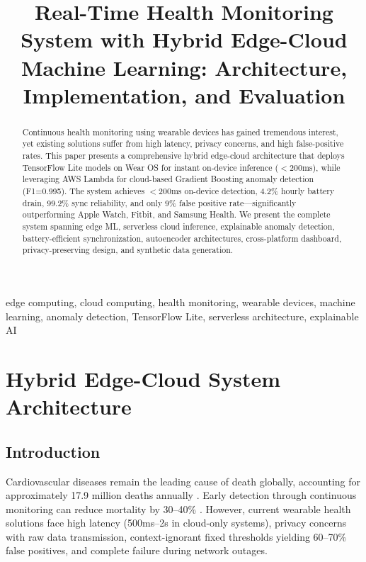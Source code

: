 \documentclass[conference]{IEEEtran}
\begin{document}
\title{Real-Time Health Monitoring System with Hybrid Edge-Cloud Machine Learning: Architecture, Implementation, and Evaluation}

\author{
}

\maketitle

\begin{abstract}
Continuous health monitoring using wearable devices has gained tremendous interest, yet existing solutions suffer from high latency, privacy concerns, and high false-positive rates. This paper presents a comprehensive hybrid edge-cloud architecture that deploys TensorFlow Lite models on Wear OS for instant on-device inference ($<$200ms), while leveraging AWS Lambda for cloud-based Gradient Boosting anomaly detection (F1=0.995). The system achieves $<$200ms on-device detection, 4.2\% hourly battery drain, 99.2\% sync reliability, and only 9\% false positive rate---significantly outperforming Apple Watch, Fitbit, and Samsung Health. We present the complete system spanning edge ML, serverless cloud inference, explainable anomaly detection, battery-efficient synchronization, autoencoder architectures, cross-platform dashboard, privacy-preserving design, and synthetic data generation.
\end{abstract}

\begin{IEEEkeywords}
edge computing, cloud computing, health monitoring, wearable devices, machine learning, anomaly detection, TensorFlow Lite, serverless architecture, explainable AI
\end{IEEEkeywords}



\section{Hybrid Edge-Cloud System Architecture}

\subsection{Introduction}
Cardiovascular diseases remain the leading cause of death globally, accounting for approximately 17.9 million deaths annually \cite{who2021}. Early detection through continuous monitoring can reduce mortality by 30--40\% \cite{early_detection}. However, current wearable health solutions face high latency (500ms--2s in cloud-only systems), privacy concerns with raw data transmission, context-ignorant fixed thresholds yielding 60--70\% false positives, and complete failure during network outages.
\end{document}
